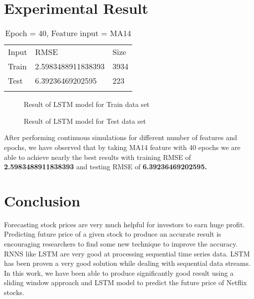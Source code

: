 \documentclass[5p,,preprint,12pt,twocolumn]{elsarticle}
\makeatletter
\def\tblbottomrule{\noalign{\vspace*{6pt}}\hline\noalign{\vspace*{2pt}}}
\def\tblmidrule{\noalign{\vspace*{6pt}}\hline\noalign{\vspace*{2pt}}}
\def\fixFloatSize#1{}%
\makeatother
\begin{document}
    
\section{\textbf{Experimental Result}}

\begin{table}[!htbp]
\caption{{Epoch = 40, Feature input = MA14} }
\label{tw-dcd07506a414}
\def\arraystretch{1}
\ignorespaces 
\centering 
\begin{tabulary}{\linewidth}{LLL}
\hline 
Input & RMSE & Size\\
\tblmidrule 
Train &
  2.5983488911838393 &
  3934\\
Test &
  6.39236469202595 &
  223\\
\tblbottomrule 
\end{tabulary}\par 
\end{table}

\bgroup
\fixFloatSize{images/723bbe78-9395-4ad9-b847-0eec02b39824-u95-5-ma14-nflx-40-e-train.png}
\begin{figure}[!htbp]
\centering \makeatletter{}
\makeatother 
\caption{{Result of LSTM model for Train data set}}
\label{f-817bed2af17b}
\end{figure}
\egroup

\bgroup
\fixFloatSize{images/efbccd2d-0836-49e8-837d-9fa72e810469-u95-5-ma14-nflx-40-e.png}
\begin{figure}[!htbp]
\centering \makeatletter{}
\makeatother 
\caption{{Result of LSTM model for Test data set}}
\label{f-09a04fe25613}
\end{figure}
\egroup
After performing continuous simulations for different number of features and epochs, we have observed that by taking MA14 feature with 40 epochs we are able to achieve nearly the best results with training RMSE of \textbf{2.5983488911838393} and testing RMSE of \textbf{6.39236469202595.}
    
\section{\textbf{Conclusion} \textbf{\space }}
Forecasting stock prices are very much helpful for investors to earn huge profit. Predicting future price of a given stock to produce an accurate result is encouraging researchers to find some new technique to improve the accuracy. RNNS like LSTM are very good at processing sequential time series data. LSTM has been proven a very good solution while dealing with sequential data streams. In this work, we have been able to produce significantly good result using a sliding window approach and LSTM model to predict the future price of Netflix stocks.


    






\end{document}
